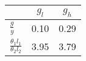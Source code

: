 \begin{tiny}\begin{tabular}{|l|c|c|}
\hline
&\textbf{$g_l$}&\textbf{$g_h$}\\\hline
\textbf{$\frac{g}{y}$}&0.10&0.29\\\hline
\textbf{$\frac{\theta_1 l_1}{\theta_2 l_2}$}&3.95&3.79\\\hline
\end{tabular}
\end{tiny}